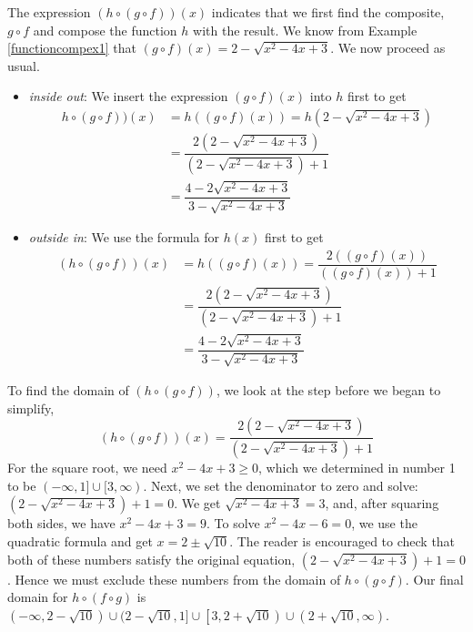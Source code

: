 {
The expression $(h \circ (g \circ f))(x)$ indicates that we first find the composite, $g \circ f$ and compose the function $h$ with the result.  We know from Example \ref{functioncompex1} that $(g \circ f)(x) =  2 - \sqrt{x^2-4x+3}$.  We now proceed as usual.

\begin{itemize}

\item  \textit{inside out}: We insert the expression $(g \circ f)(x)$ into $h$ first to get
\begin{align*}
h \circ (g \circ f))(x) & = h((g \circ f)(x))=h\left(2 - \sqrt{x^2-4x+3}\right)\\
 & = \dfrac{2 \left(2 - \sqrt{x^2-4x+3}\right)}{\left(2 - \sqrt{x^2-4x+3}\right)+1} \\
 & = \dfrac{4 - 2\sqrt{x^2-4x+3}}{3 - \sqrt{x^2-4x+3}}
\end{align*}

\item  \textit{outside in}:  We use the formula for $h(x)$ first to get
\begin{align*}
(h \circ (g \circ f))(x) & = h((g \circ f)(x))=\dfrac{2 \left( (g \circ f)(x)\right)}{  \left( (g \circ f)(x)\right) + 1} \\
& = \dfrac{2 \left(2 - \sqrt{x^2-4x+3}\right)}{\left(2 - \sqrt{x^2-4x+3}\right)+1}\\
 & = \dfrac{4 - 2\sqrt{x^2-4x+3}}{3 - \sqrt{x^2-4x+3}}
 \end{align*}
 
 \end{itemize}
 
To find the domain of $(h \circ (g \circ f))$, we look at the step before we began to simplify, \[(h \circ (g \circ f))(x) = \frac{2 \left(2 - \sqrt{x^2-4x+3}\right)}{\left(2 - \sqrt{x^2-4x+3}\right)+1}\]  For the square root, we need $x^2-4x+3 \geq 0$, which we determined in number 1 to be $(-\infty, 1] \cup [3,\infty)$.  Next, we set the denominator to zero and solve:  $\left(2 - \sqrt{x^2-4x+3}\right)+1 = 0$.  We get $\sqrt{x^2-4x+3} = 3$, and, after squaring both sides, we have $x^2-4x+3 = 9$.  To solve $x^2-4x-6 = 0$, we use the quadratic formula and get $x = 2 \pm \sqrt{10}$.  The reader is encouraged to check that both of these numbers satisfy the original equation, $\left(2 - \sqrt{x^2-4x+3}\right)+1 = 0$.  Hence we must exclude these numbers from the domain of $h \circ (g \circ f)$.  Our final domain for $h \circ (f \circ g)$ is $(-\infty, 2 -\sqrt{10}) \cup (2 - \sqrt{10}, 1] \cup \left[3, 2 + \sqrt{10}\right) \cup \left(2+\sqrt{10}, \infty\right)$.

}
